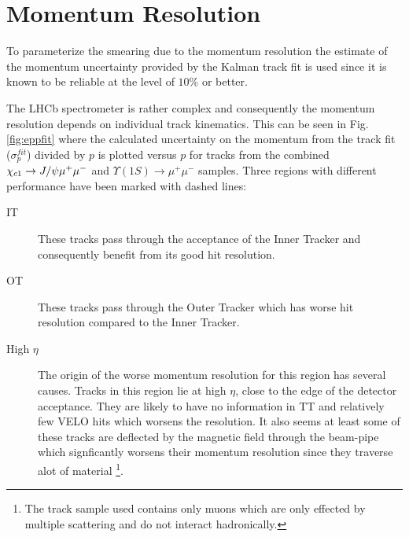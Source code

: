 \section{Momentum Resolution}
\label{sec:ep}
To parameterize the smearing due to the momentum resolution the
estimate of the momentum uncertainty provided by the Kalman track fit
is used since it is known to be reliable at the level of $10 \%$ or better.  

%
The LHCb spectrometer is rather complex and consequently the momentum
resolution depends on individual track kinematics. This can be seen in
Fig.  \ref{fig:eppfit} where the calculated uncertainty on the momentum from the
track fit ($\sigma^{fit}_{p}$) divided by $p$ is plotted versus $p$ for tracks from the
combined ${\chi_{{c} 1}} \rightarrow J/\psi \mu^+ \mu^-$ and $\Upsilon(1S) \rightarrow
\mu^+ \mu^-$ samples. Three regions with different performance have been marked with dashed lines:
\begin{description}
\item[IT] These tracks pass through
  the acceptance of the Inner Tracker and consequently benefit from
  its good hit resolution.
\item[OT] These tracks pass through the Outer Tracker which has worse
  hit resolution compared to the Inner Tracker.
\item[High $\eta$] The origin of the worse momentum resolution for this region
  has several causes. Tracks in this region lie at high $\eta$, close to
  the edge of the detector acceptance. They are likely to have no
  information in TT and relatively few VELO hits which worsens the
  resolution. It also seems at least some of these tracks are deflected
  by the magnetic field through the beam-pipe which signficantly worsens their
  momentum resolution since they traverse alot of material
  \footnote{The track sample used contains only muons which are only
    effected by multiple scattering and do not interact hadronically.}. 
\end{description}
%
